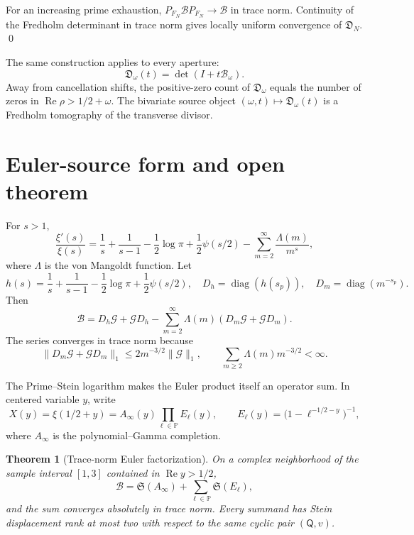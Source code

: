 \documentclass[11pt]{article}
\newtheorem{theorem}{Theorem}[section]
\theoremstyle{definition}
\theoremstyle{remark}
\newcommand{\PP}{\mathbb P}
\newcommand{\cB}{\mathcal B}
\newcommand{\cG}{\mathcal G}
\newcommand{\diag}{\operatorname{diag}}
\newcommand{\Rea}{\operatorname{Re}}
\newcommand{\norm}[1]{\lVert #1\rVert}
\begin{document}
For an increasing prime exhaustion, $P_{F_N}\cB P_{F_N}\to\cB$ in trace norm.  Continuity of the
Fredholm determinant in trace norm gives locally uniform convergence of $\mathfrak D_N$. \qed

The same construction applies to every aperture:
\begin{equation}
 \mathfrak D_\omega(t)=\det(I+t\cB_\omega).                \tag{7.2}
\end{equation}
Away from cancellation shifts, the positive-zero count of $\mathfrak D_\omega$ equals the number
of zeros in $\Rea\rho>1/2+\omega$.  The bivariate source object
$(\omega,t)\mapsto\mathfrak D_\omega(t)$ is a Fredholm tomography of the transverse divisor.

\section{Euler-source form and open theorem}
\label{sec:open}

For $s>1$,
\begin{equation}
 \frac{\xi'(s)}{\xi(s)}
 =\frac1s+\frac1{s-1}-\frac12\log\pi
   +\frac12\psi(s/2)
   -\sum_{m=2}^{\infty}\frac{\Lambda(m)}{m^s},              \tag{8.1}
\end{equation}
where $\Lambda$ is the von Mangoldt function.  Let
\[
 h(s)=\frac1s+\frac1{s-1}-\frac12\log\pi+\frac12\psi(s/2),
 \quad D_h=\diag(h(s_p)),\quad D_m=\diag(m^{-s_p}).
\]
Then
\begin{equation}
 \cB
 =D_h\cG+\cG D_h
 -\sum_{m=2}^{\infty}\Lambda(m)(D_m\cG+\cG D_m).            \tag{8.2}
\end{equation}
The series converges in trace norm because
\begin{equation}
 \norm{D_m\cG+\cG D_m}_1
 \leq2m^{-3/2}\norm{\cG}_1,\qquad
 \sum_{m\geq2}\Lambda(m)m^{-3/2}<\infty.                   \tag{8.3}
\end{equation}

The Prime--Stein logarithm makes the Euler product itself an operator sum.  In centered variable
$y$, write
\begin{equation}
 X(y)=\xi(1/2+y)=A_\infty(y)\prod_{\ell\in\PP}E_\ell(y),
 \qquad
 E_\ell(y)=\bigl(1-\ell^{-1/2-y}\bigr)^{-1},               \tag{8.4}
\end{equation}
where $A_\infty$ is the polynomial--Gamma completion.

\begin{theorem}[Trace-norm Euler factorization]
\label{thm:euler-factorization}
On a complex neighborhood of the sample interval $[1,3]$ contained in $\Rea y>1/2$,
\begin{equation}
 \boxed{\quad
 \cB=\mathfrak S(A_\infty)
      +\sum_{\ell\in\PP}\mathfrak S(E_\ell),
 \quad}                                                     \tag{8.5}
\end{equation}
and the sum converges absolutely in trace norm.  Every summand has Stein displacement rank at
most two with respect to the same cyclic pair $(\mathsf Q,v)$.
\end{theorem}
\end{document}
